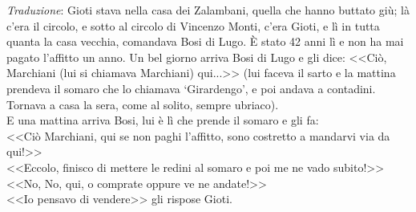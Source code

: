 \noindent \textit{Traduzione}: Gioti stava nella casa dei Zalambani, quella che hanno buttato giù; là c'era il circolo, e sotto al circolo di Vincenzo Monti, c'era Gioti, e lì in tutta quanta la casa vecchia, comandava Bosi di Lugo. È stato 42 anni lì e non ha mai pagato l'affitto un anno. Un bel giorno arriva Bosi di Lugo e gli dice: <<Ciò, Marchiani (lui si chiamava Marchiani) qui...>> (lui faceva il sarto e la mattina prendeva il somaro che lo chiamava `Girardengo', e poi andava a contadini. Tornava a casa la sera, come al solito, sempre ubriaco).\\
\indent E una mattina arriva Bosi, lui è lì che prende il somaro e gli fa:\\
\indent <<Ciò Marchiani, qui se non paghi l'affitto, sono costretto a mandarvi via da qui!>>\\
\indent <<Eccolo, finisco di mettere le redini al somaro e poi me ne vado subito!>>\\
\indent <<No, No, qui, o comprate oppure ve ne andate!>>\\
\indent <<Io pensavo di vendere>> gli rispose Gioti.\\



























